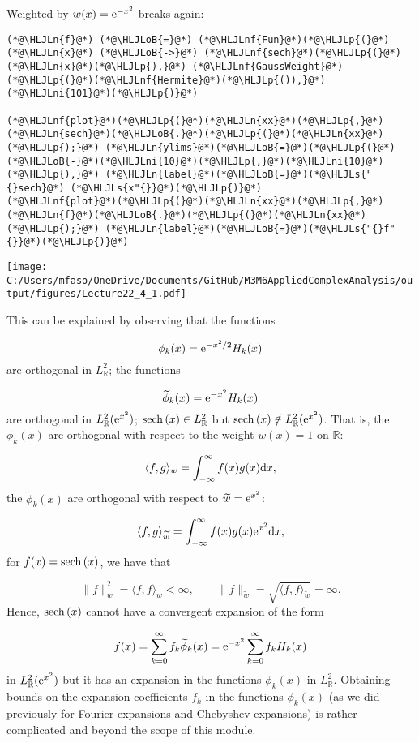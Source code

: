 \documentclass[12pt,a4paper]{article}
\newcommand{\HLJLn}[1]{#1}
\newcommand{\HLJLnf}[1]{\textcolor[RGB]{66,102,213}{#1}}
\newcommand{\HLJLs}[1]{\textcolor[RGB]{201,61,57}{#1}}
\newcommand{\HLJLni}[1]{\textcolor[RGB]{59,151,46}{#1}}
\newcommand{\HLJLoB}[1]{\textcolor[RGB]{102,102,102}{\textbf{#1}}}
\newcommand{\HLJLp}[1]{#1}
\def\D{ {\rm d} }
\def\E{ {\rm e} }
\def\sech{ {\rm sech}\, }
\begin{document}
Weighted by $w(x) = \E^{-x^2}$ breaks again:


\begin{lstlisting}
(*@\HLJLn{f}@*) (*@\HLJLoB{=}@*) (*@\HLJLnf{Fun}@*)(*@\HLJLp{(}@*)(*@\HLJLn{x}@*) (*@\HLJLoB{->}@*) (*@\HLJLnf{sech}@*)(*@\HLJLp{(}@*)(*@\HLJLn{x}@*)(*@\HLJLp{),}@*) (*@\HLJLnf{GaussWeight}@*)(*@\HLJLp{(}@*)(*@\HLJLnf{Hermite}@*)(*@\HLJLp{()),}@*)(*@\HLJLni{101}@*)(*@\HLJLp{)}@*)

(*@\HLJLnf{plot}@*)(*@\HLJLp{(}@*)(*@\HLJLn{xx}@*)(*@\HLJLp{,}@*) (*@\HLJLn{sech}@*)(*@\HLJLoB{.}@*)(*@\HLJLp{(}@*)(*@\HLJLn{xx}@*)(*@\HLJLp{);}@*) (*@\HLJLn{ylims}@*)(*@\HLJLoB{=}@*)(*@\HLJLp{(}@*)(*@\HLJLoB{-}@*)(*@\HLJLni{10}@*)(*@\HLJLp{,}@*)(*@\HLJLni{10}@*)(*@\HLJLp{),}@*) (*@\HLJLn{label}@*)(*@\HLJLoB{=}@*)(*@\HLJLs{"{}sech}@*) (*@\HLJLs{x"{}}@*)(*@\HLJLp{)}@*)
(*@\HLJLnf{plot}@*)(*@\HLJLp{(}@*)(*@\HLJLn{xx}@*)(*@\HLJLp{,}@*) (*@\HLJLn{f}@*)(*@\HLJLoB{.}@*)(*@\HLJLp{(}@*)(*@\HLJLn{xx}@*)(*@\HLJLp{);}@*) (*@\HLJLn{label}@*)(*@\HLJLoB{=}@*)(*@\HLJLs{"{}f"{}}@*)(*@\HLJLp{)}@*)
\end{lstlisting}

\texttt{[image: C:/Users/mfaso/OneDrive/Documents/GitHub/M3M6AppliedComplexAnalysis/output/figures/Lecture22\_4\_1.pdf]}

This can be explained by observing that the functions

\[
\phi_k(x) = \E^{-x^2/2}H_k(x)
\]
are orthogonal in $L^2_{\mathbb{R}}$; the functions

\[
\widetilde{\phi}_k(x) = \E^{-x^2}H_k(x)
\]
are orthogonal in $L^2_{\mathbb{R}}(\E^{x^2})$; $\sech(x) \in L^2_{\mathbb{R}}$ but  $\sech(x) \notin L^2_{\mathbb{R}}(\E^{x^2})$. That is, the  $\phi_k(x)$ are orthogonal with respect to the weight $w(x) = 1$ on $\mathbb{R}$:

\[
\langle f, g \rangle_{w} = \int_{-\infty}^{\infty}f(x)g(x) \D x,
\]
the $\widetilde{\phi}_k(x)$ are orthogonal with respect to $\widetilde{w} = \E^{x^2}$:

\[
\langle f, g \rangle_{\widetilde{w}} = \int_{-\infty}^{\infty}f(x)g(x) \E^{x^2} \D x,
\]
for $f(x) = \sech(x)$, we have that

\[
\| f \|_{w}^2 = \langle f, f \rangle_{w} < \infty, \qquad \| f \|_{\widetilde{w}} = \sqrt{\langle f, f \rangle_{\widetilde{w}}} = \infty.
\]
Hence, $\sech(x)$ cannot have a convergent expansion of the form

\[
f(x) = \sum_{k = 0}^{\infty} f_k \widetilde{\phi}_k(x) = \E^{-x^2}  \sum_{k = 0}^{\infty} f_k H_k(x)
\]
in $L^2_{\mathbb{R}}(\E^{x^2})$ but it has an expansion in the functions $\phi_k(x)$ in $L^2_{\mathbb{R}}$. Obtaining bounds on the expansion coefficients $f_k$ in the functions $\phi_k(x)$ (as we did previously for Fourier expansions and Chebyshev expansions) is rather complicated and beyond the scope of this module.
\end{document}
